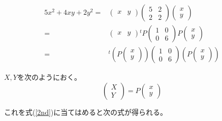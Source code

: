 \documentclass[12pt,b5paper]{ltjsarticle}
\begin{document}
\begin{align}
 5x^2 + 4xy + 2y^2 =&
  \begin{pmatrix}
   x & y
  \end{pmatrix}
  \begin{pmatrix}
   5 & 2\\ 2 & 2
  \end{pmatrix}
  \begin{pmatrix}
   x \\ y
  \end{pmatrix}\\
  =&
  \begin{pmatrix}
   x & y
  \end{pmatrix}
  {}^{t}\!P
  \begin{pmatrix}
   1 & 0\\ 0 & 6
  \end{pmatrix}
  P
  \begin{pmatrix}
   x \\ y
  \end{pmatrix}\\
  =&
  {}^{t}\!\left( P \begin{pmatrix} x \\ y \end{pmatrix} \right)
  \begin{pmatrix}
   1 & 0\\ 0 & 6
  \end{pmatrix}
  \left( P \begin{pmatrix} x \\ y \end{pmatrix} \right)
 \label{2nd}
\end{align}

$X,Y$を次のようにおく。
\begin{equation}
 \begin{pmatrix}X\\Y\end{pmatrix}
 =
  P \begin{pmatrix} x \\ y \end{pmatrix}
\end{equation}

これを式(\ref{2nd})に当てはめると次の式が得られる。
\end{document}
